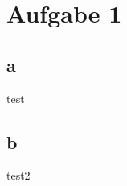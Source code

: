\section{Aufgabe 1}
\label{sec:Aufgabe 1}

\subsection{a}
\label{sec:a}
test

\subsection{b}
\label{sec:b}
test2\\ 